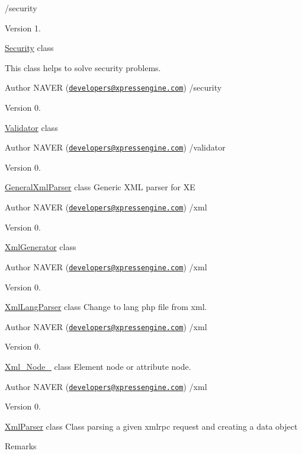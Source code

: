 /security \begin{DoxyVersion}{Version}
1.
\end{DoxyVersion}

\begin{DoxyItemize}
\item \hyperlink{classSecurity}{Security} class
\item This class helps to solve security problems. \begin{DoxyAuthor}{Author}
N\+A\+V\+E\+R (\href{mailto:developers@xpressengine.com}{\tt developers@xpressengine.\+com}) /security 
\end{DoxyAuthor}
\begin{DoxyVersion}{Version}
0.
\end{DoxyVersion}
\hyperlink{classValidator}{Validator} class \begin{DoxyAuthor}{Author}
N\+A\+V\+E\+R (\href{mailto:developers@xpressengine.com}{\tt developers@xpressengine.\+com}) /validator 
\end{DoxyAuthor}
\begin{DoxyVersion}{Version}
0.
\end{DoxyVersion}
\hyperlink{classGeneralXmlParser}{General\+Xml\+Parser} class Generic X\+M\+L parser for X\+E \begin{DoxyAuthor}{Author}
N\+A\+V\+E\+R (\href{mailto:developers@xpressengine.com}{\tt developers@xpressengine.\+com}) /xml 
\end{DoxyAuthor}
\begin{DoxyVersion}{Version}
0.
\end{DoxyVersion}
\hyperlink{classXmlGenerator}{Xml\+Generator} class \begin{DoxyAuthor}{Author}
N\+A\+V\+E\+R (\href{mailto:developers@xpressengine.com}{\tt developers@xpressengine.\+com}) /xml 
\end{DoxyAuthor}
\begin{DoxyVersion}{Version}
0.
\end{DoxyVersion}
\hyperlink{classXmlLangParser}{Xml\+Lang\+Parser} class Change to lang php file from xml. \begin{DoxyAuthor}{Author}
N\+A\+V\+E\+R (\href{mailto:developers@xpressengine.com}{\tt developers@xpressengine.\+com}) /xml 
\end{DoxyAuthor}
\begin{DoxyVersion}{Version}
0.
\end{DoxyVersion}
\hyperlink{classXml__Node__}{Xml\+\_\+\+Node\+\_\+} class Element node or attribute node. \begin{DoxyAuthor}{Author}
N\+A\+V\+E\+R (\href{mailto:developers@xpressengine.com}{\tt developers@xpressengine.\+com}) /xml 
\end{DoxyAuthor}
\begin{DoxyVersion}{Version}
0.
\end{DoxyVersion}
\hyperlink{classXmlParser}{Xml\+Parser} class Class parsing a given xmlrpc request and creating a data object \begin{DoxyRemark}{Remarks}


\end{DoxyRemark}
\end{DoxyItemize}
